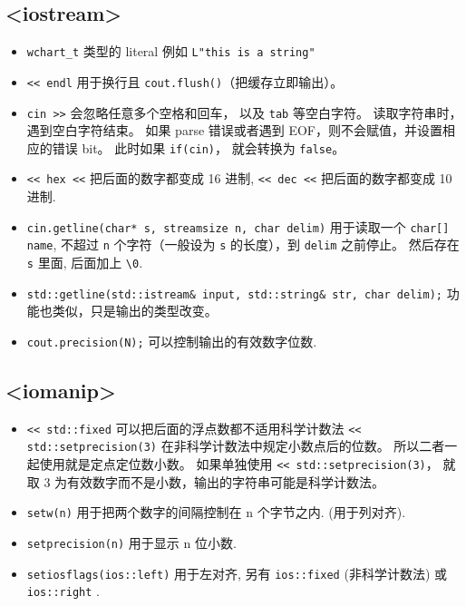 \subsection{<iostream>}
\begin{itemize}
\item \verb`wchart_t` 类型的 literal 例如 \verb`L"this is a string"`
\item \verb`<< endl` 用于换行且 \verb|cout.flush()|（把缓存立即输出）。
\item \verb|cin >>| 会忽略任意多个空格和回车， 以及 \verb|tab| 等空白字符。 读取字符串时，遇到空白字符结束。 如果 parse 错误或者遇到 EOF，则不会赋值，并设置相应的错误 bit。 此时如果 \verb|if(cin)|， 就会转换为 \verb|false|。
\item \verb`<< hex <<` 把后面的数字都变成 16 进制, \verb`<< dec <<` 把后面的数字都变成 10 进制.
\item \verb`cin.getline(char* s, streamsize n, char delim)` 用于读取一个 \verb`char[] name`, 不超过 \verb|n| 个字符（一般设为 \verb|s| 的长度），到 \verb|delim| 之前停止。 然后存在 \verb|s| 里面, 后面加上 \verb`\0`.
\item \verb|std::getline(std::istream& input, std::string& str, char delim);| 功能也类似，只是输出的类型改变。
\item \verb`cout.precision(N);` 可以控制输出的有效数字位数.
\end{itemize}

\subsection{<iomanip>}
\begin{itemize}
\item \verb|<< std::fixed| 可以把后面的浮点数都不适用科学计数法 \verb|<< std::setprecision(3)| 在非科学计数法中规定小数点后的位数。 所以二者一起使用就是定点定位数小数。 如果单独使用 \verb|<< std::setprecision(3)|， 就取 3 为有效数字而不是小数，输出的字符串可能是科学计数法。
\item \verb`setw(n)` 用于把两个数字的间隔控制在 n 个字节之内. (用于列对齐).
\item \verb`setprecision(n)` 用于显示 n 位小数.
\item \verb`setiosflags(ios::left)` 用于左对齐, 另有 \verb`ios::fixed` (非科学计数法) 或 \verb`ios::right` .
\end{itemize}

